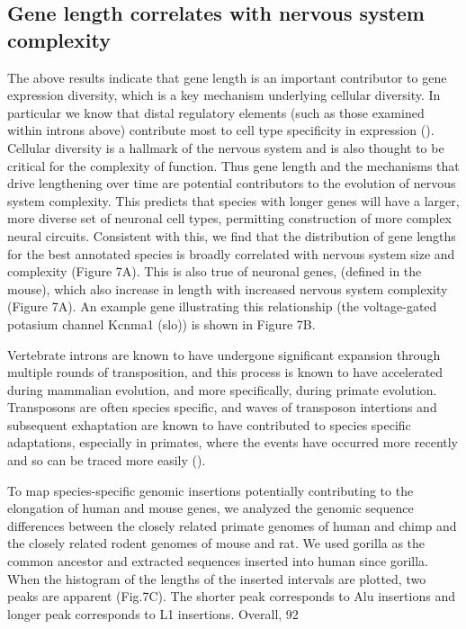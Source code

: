 \subsection{Gene length correlates with nervous system complexity}

The above results indicate that gene length is an important contributor to gene expression diversity, which is a key mechanism underlying cellular diversity. In particular we know that distal regulatory elements (such as those examined within introns above) contribute most to cell type specificity in expression ().  Cellular diversity is a hallmark of the nervous system and is also thought to be critical for the complexity of function. Thus gene length and the mechanisms that drive lengthening over time are potential contributors to the evolution of nervous system complexity. This predicts that species with longer genes will have a larger, more diverse set of neuronal cell types, permitting construction of more complex neural circuits. Consistent with this, we find that the distribution of gene lengths for the best annotated species is broadly correlated with nervous system size and complexity (Figure 7A). This is also true of neuronal genes, (defined in the mouse), which also increase in length with increased nervous system complexity (Figure 7A). An example gene illustrating this relationship (the voltage-gated potasium channel Kcnma1 (slo)) is shown in Figure 7B. 

Vertebrate introns are known to have undergone significant expansion through multiple rounds of transposition, and this process is known to have accelerated during mammalian evolution, and more specifically, during primate evolution. Transposons are often species specific, and waves of transposon intertions and subsequent exhaptation are known to have contributed to species specific adaptations, especially in primates, where the events have occurred more recently and so can be traced more easily (). 

To map species-specific genomic insertions potentially contributing to the elongation of human and mouse genes, we analyzed the genomic sequence differences between the closely related primate genomes of human and chimp and the closely related rodent genomes of mouse and rat. We used gorilla as the common ancestor and extracted sequences inserted into human since gorilla. When the histogram of the lengths of the inserted intervals are plotted, two peaks are apparent (Fig.7C). The shorter peak corresponds to Alu insertions and longer peak corresponds to L1 insertions. Overall, 92%

